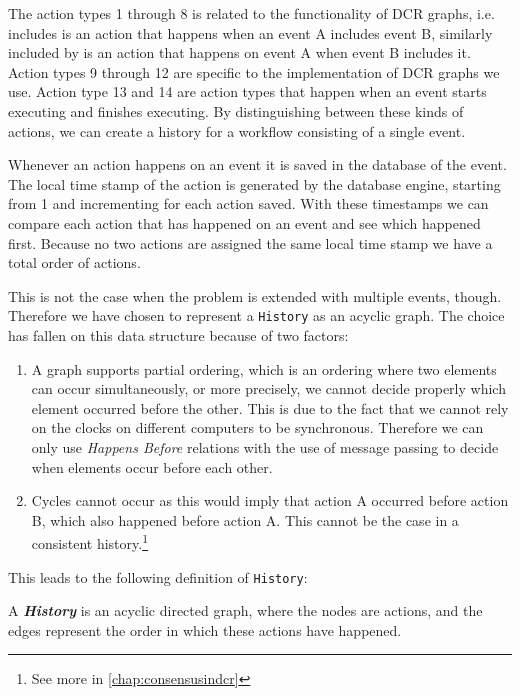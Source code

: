 	\newpar The action types 1 through 8 is related to the functionality of DCR graphs, i.e. includes is an action that happens when an event A includes event B, similarly included by is an action that happens on event A when event B includes it. Action types 9 through 12 are specific to the implementation of DCR graphs we use. Action type 13 and 14 are action types that happen when an event starts executing and finishes executing. By distinguishing between these kinds of actions, we can create a history for a workflow consisting of a single event. 
	
	\newpar Whenever an action happens on an event it is saved in the database of the event. The local time stamp of the action is generated by the database engine, starting from 1 and incrementing for each action saved. With these timestamps we can compare each action that has happened on an event and see which happened first. Because no two actions are assigned the same local time stamp we have a total order of actions.

	\newpar This is not the case when the problem is extended with multiple events, though. Therefore we have chosen to represent a \texttt{History} as an acyclic graph. The choice has fallen on this data structure because of two factors:
	
	\begin{enumerate}
		\item A graph supports partial ordering, which is an ordering where two elements can occur simultaneously, or more precisely, we cannot decide properly which element occurred before the other. This is due to the fact that we cannot rely on the clocks on different computers to be synchronous. Therefore we can only use \textit{Happens Before} relations with the use of message passing to decide when elements occur before each other.
	
		\item Cycles cannot occur as this would imply that action A occurred before action B, which also happened before action A. This cannot be the case in a consistent history.\footnote{See more in \autoref{chap:consensusindcr}}
	\end{enumerate}

	
	\newpar This leads to the following definition of \texttt{History}:
	
	\begin{definition}
		A \textit{\textbf{History}} is an acyclic directed graph, where the nodes are actions, and the edges represent the order in which these actions have happened.
	\end{definition}
	
